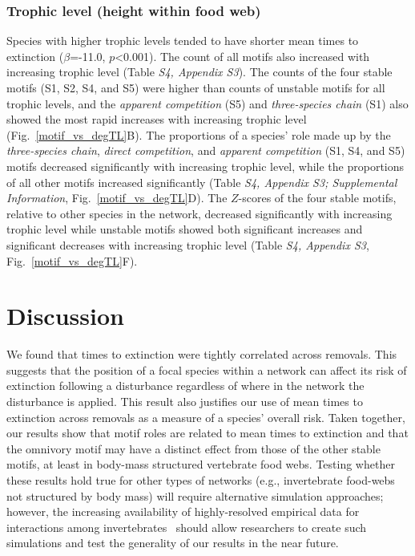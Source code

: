 \documentclass[12pt]{article}
\begin{document}
        \subsubsection*{Trophic level (height within food web)}
            
            Species with higher trophic levels tended to have shorter mean times to extinction ($\beta$=-11.0, $p$\textless0.001).
            The count of all motifs also increased with increasing trophic level (Table \emph{S4, Appendix S3}). 
            The counts of the four stable motifs (S1, S2, S4, and S5) were higher than counts of unstable motifs for all trophic levels, and the \emph{apparent competition} (S5) and \emph{three-species chain} (S1) also showed the most rapid increases with increasing trophic level (Fig.~\ref{motif_vs_degTL}B).
            The proportions of a species' role made up by the \emph{three-species chain}, \emph{direct competition}, and \emph{apparent competition} (S1, S4, and S5) motifs decreased significantly with increasing trophic level, while the proportions of all other motifs increased significantly (Table \emph{S4, Appendix S3; Supplemental Information}, Fig.~\ref{motif_vs_degTL}D).
            The $Z$-scores of the four stable motifs, relative to other species in the network, decreased significantly with increasing trophic level while unstable motifs showed both significant increases and significant decreases with increasing trophic level (Table \emph{S4, Appendix S3}, Fig.~\ref{motif_vs_degTL}F).


\section*{Discussion}

    We found that times to extinction were tightly correlated across removals. 
    This suggests that the position of a focal species within a network can affect its risk of extinction following a disturbance regardless of where in the network the disturbance is applied. This result also justifies our use of mean times to extinction across removals as a measure of a species' overall risk.
    Taken together, our results show that motif roles are related to mean times to extinction and that the omnivory motif may have a distinct effect from those of the other stable motifs, at least in body-mass structured vertebrate food webs.
    Testing whether these results hold true for other types of networks (e.g., invertebrate food-webs not structured by body mass) will require alternative simulation approaches; however, the increasing availability of highly-resolved empirical data for interactions among invertebrates~\citep{} should allow researchers to create such simulations and test the generality of our results in the near future.
\end{document}
